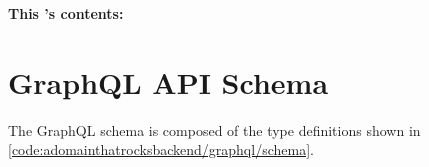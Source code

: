 \begin{figure}[H]%
		\label{fig:\chaptername\thechapter}%
\end{figure}

\vspace*{-1.45cm}
\noindent \large{\textbf{This {\MakeLowercase{\chaptername}}'s contents:}}
\vspace*{-0.65cm}
\minitoc \mtcskip \minilof
\vspace*{-1.0cm}
\section[GraphQL API Schema]{\gls{GraphQL} \acrshort{API} Schema} \label{section:APIDocs/GraphQLAPISchema}
The \gls{GraphQL schema} is composed of the type definitions shown in \hyperref[code:adomainthatrocksbackend/graphql/schema]{\autoref{code:adomainthatrocksbackend/graphql/schema}}.

